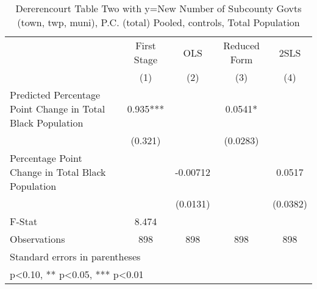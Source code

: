 \begin{table}[htbp]\centering
\def\sym#1{\ifmmode^{#1}\else\(^{#1}\)\fi}
\caption{Dererencourt Table Two with y=New Number of Subcounty Govts (town, twp, muni), P.C. (total)  Pooled,  controls, Total Population}
\begin{tabular}{l*{4}{c}}
\toprule
                    & First Stage   &         OLS   &Reduced Form   &        2SLS   \\
                    &\multicolumn{1}{c}{(1)}   &\multicolumn{1}{c}{(2)}   &\multicolumn{1}{c}{(3)}   &\multicolumn{1}{c}{(4)}   \\
\midrule
Predicted Percentage Point Change in Total Black Population&       0.935***&               &      0.0541*  &               \\
                    &     (0.321)   &               &    (0.0283)   &               \\
\addlinespace
Percentage Point Change in Total Black Population&               &    -0.00712   &               &      0.0517   \\
                    &               &    (0.0131)   &               &    (0.0382)   \\
\midrule
F-Stat              &       8.474   &               &               &               \\
Observations        &         898   &         898   &         898   &         898   \\
\bottomrule
\multicolumn{5}{l}{\footnotesize Standard errors in parentheses}\\
\multicolumn{5}{l}{\footnotesize * p<0.10, ** p<0.05, *** p<0.01}\\
\end{tabular}
\end{table}
